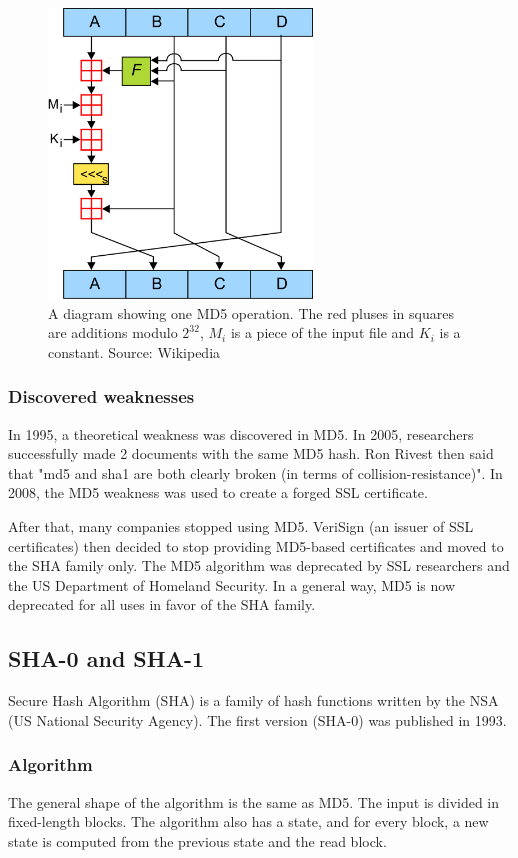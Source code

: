 \documentclass[12pt,a4paper]{article}
\begin{document}
\begin{figure}[h]
\begin{center}
\includegraphics[width=7cm]{MD5.pdf}
\end{center}
\caption{A diagram showing one MD5 operation. The red pluses in squares are additions modulo $2^{32}$, $M_i$ is a piece of the input file and $K_i$ is a constant. Source: Wikipedia}\label{fig:md5}
\end{figure}

\subsubsection{Discovered weaknesses}
In 1995, a theoretical weakness was discovered in MD5. In 2005, researchers successfully made 2 documents with the same MD5 hash. Ron Rivest then said that "md5 and sha1 are both clearly broken (in terms of collision-resistance)". In 2008, the MD5 weakness was used to create a forged SSL certificate.

After that, many companies stopped using MD5. VeriSign (an issuer of SSL certificates) then decided to stop providing MD5-based certificates and moved to the SHA family only. The MD5 algorithm was deprecated by SSL researchers and the US Department of Homeland Security. In a general way, MD5 is now deprecated for all uses in favor of the SHA family.

\subsection{SHA-0 and SHA-1}
Secure Hash Algorithm (SHA) is a family of hash functions written by the NSA (US National Security Agency). The first version (SHA-0) was published in 1993.

\subsubsection{Algorithm}
The general shape of the algorithm is the same as MD5. The input is divided in fixed-length blocks. The algorithm also has a state, and for every block, a new state is computed from the previous state and the read block.
\end{document}
